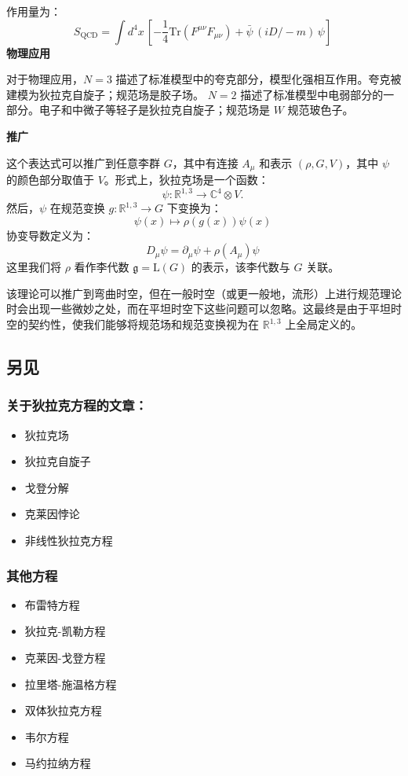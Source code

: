 作用量为：
\[
S_{\text{QCD}} = \int d^{4}x \, \left[ -\frac{1}{4} \text{Tr}(F^{\mu \nu} F_{\mu \nu}) + {\bar {\psi}} \, (iD\!\!\!\!{\big /} - m) \, \psi \right]~
\]
\textbf{物理应用}

对于物理应用，\( N = 3 \) 描述了标准模型中的夸克部分，模型化强相互作用。夸克被建模为狄拉克自旋子；规范场是胶子场。 \( N = 2 \) 描述了标准模型中电弱部分的一部分。电子和中微子等轻子是狄拉克自旋子；规范场是 \( W \) 规范玻色子。

\textbf{推广}

这个表达式可以推广到任意李群 \( G \)，其中有连接 \( A_{\mu} \) 和表示 \( (\rho, G, V) \)，其中 \( \psi \) 的颜色部分取值于 \( V \)。形式上，狄拉克场是一个函数：
\[
\psi : \mathbb{R}^{1,3} \to \mathbb{C}^4 \otimes V.~
\]
然后，\( \psi \) 在规范变换 \( g : \mathbb{R}^{1,3} \to G \) 下变换为：
\[
\psi(x) \mapsto \rho(g(x)) \psi(x)~
\]
协变导数定义为：
\[
D_{\mu} \psi = \partial_{\mu} \psi + \rho(A_{\mu}) \psi~
\]
这里我们将 \( \rho \) 看作李代数 \( \mathfrak{g} = \text{L}(G) \) 的表示，该李代数与 \( G \) 关联。

该理论可以推广到弯曲时空，但在一般时空（或更一般地，流形）上进行规范理论时会出现一些微妙之处，而在平坦时空下这些问题可以忽略。这最终是由于平坦时空的契约性，使我们能够将规范场和规范变换视为在 \( \mathbb{R}^{1,3} \) 上全局定义的。

\subsection{另见}
\subsubsection{关于狄拉克方程的文章：}
\begin{itemize}
\item 狄拉克场
\item 狄拉克自旋子
\item 戈登分解
\item 克莱因悖论
\item 非线性狄拉克方程
\end{itemize}
\subsubsection{其他方程}
\begin{itemize}
\item 布雷特方程
\item 狄拉克-凯勒方程
\item 克莱因-戈登方程
\item 拉里塔-施温格方程
\item 双体狄拉克方程
\item 韦尔方程
\item 马约拉纳方程
\end{itemize}
